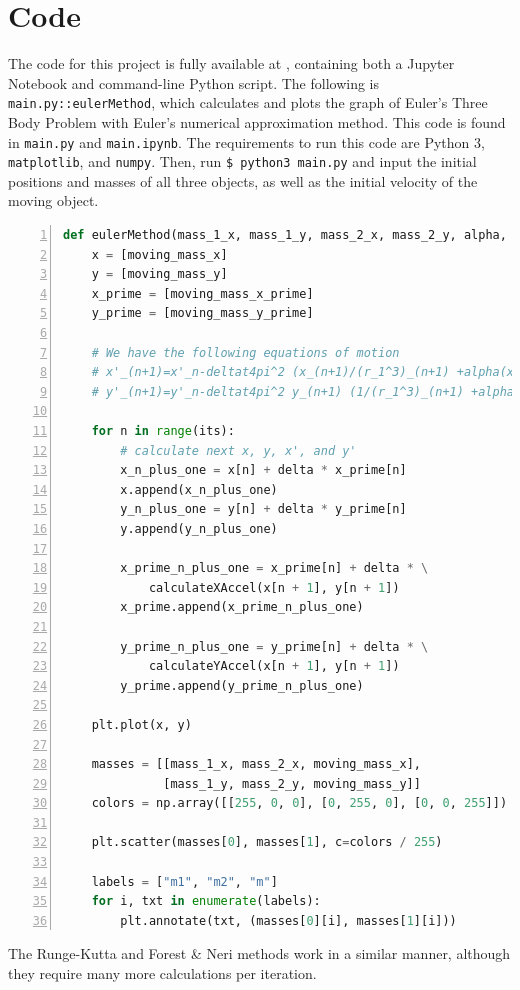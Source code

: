 \documentclass[preprint,titlepage,preprintnumbers,amsmath,amssymb,aps,11pt]{revtex4-2}
\begin{document}
\appendix
\section{Code}
The code for this project is fully available at \href{https://github.com/jasperswallen/PHYS304-Project}{},
containing both a Jupyter Notebook and command-line Python script. The following is \texttt{main.py::eulerMethod}, which calculates and plots the graph of Euler's Three Body Problem with Euler's numerical approximation method. This code is found in \texttt{main.py} and \texttt{main.ipynb}. The requirements to run this code are Python 3, \texttt{matplotlib}, and \texttt{numpy}. Then, run \texttt{\$ python3 main.py} and input the initial positions and masses of all three objects, as well as the initial velocity of the moving object.

\begin{lstlisting}[language=Python, numbers=left, breaklines=true]
def eulerMethod(mass_1_x, mass_1_y, mass_2_x, mass_2_y, alpha, moving_mass_x, moving_mass_y, moving_mass_x_prime, moving_mass_y_prime, its, delta):
    x = [moving_mass_x]
    y = [moving_mass_y]
    x_prime = [moving_mass_x_prime]
    y_prime = [moving_mass_y_prime]

    # We have the following equations of motion
    # x'_(n+1)=x'_n-deltat4pi^2 (x_(n+1)/(r_1^3)_(n+1) +alpha(x_(n+1)-d)/(r_2^3)_(n+1))
    # y'_(n+1)=y'_n-deltat4pi^2 y_(n+1) (1/(r_1^3)_(n+1) +alpha/(r_2^3)_(n+1))

    for n in range(its):
        # calculate next x, y, x', and y'
        x_n_plus_one = x[n] + delta * x_prime[n]
        x.append(x_n_plus_one)
        y_n_plus_one = y[n] + delta * y_prime[n]
        y.append(y_n_plus_one)

        x_prime_n_plus_one = x_prime[n] + delta * \
            calculateXAccel(x[n + 1], y[n + 1])
        x_prime.append(x_prime_n_plus_one)

        y_prime_n_plus_one = y_prime[n] + delta * \
            calculateYAccel(x[n + 1], y[n + 1])
        y_prime.append(y_prime_n_plus_one)

    plt.plot(x, y)

    masses = [[mass_1_x, mass_2_x, moving_mass_x],
              [mass_1_y, mass_2_y, moving_mass_y]]
    colors = np.array([[255, 0, 0], [0, 255, 0], [0, 0, 255]])

    plt.scatter(masses[0], masses[1], c=colors / 255)

    labels = ["m1", "m2", "m"]
    for i, txt in enumerate(labels):
        plt.annotate(txt, (masses[0][i], masses[1][i]))
\end{lstlisting}

The Runge-Kutta and Forest \& Neri methods work in a similar manner, although they require many more calculations per iteration.


\end{document}
